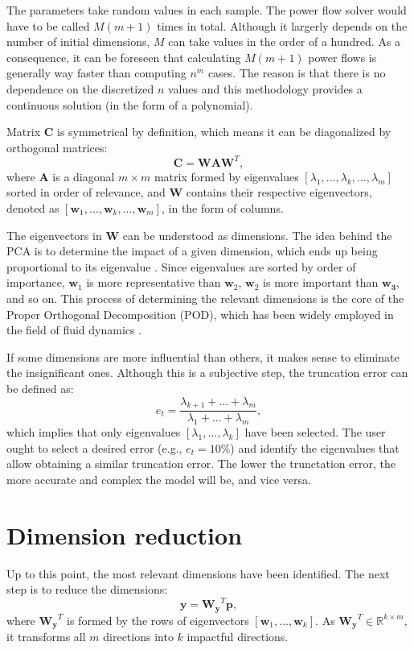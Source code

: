 The parameters take random values in each sample. The power flow solver would have to be called $M(m+1)$ times in total. Although it largerly depends on the number of initial dimensions, $M$ can take values in the order of a hundred. As a consequence, it can be foreseen that calculating $M(m+1)$ power flows is generally way faster than computing $n^m$ cases. The reason is that there is no dependence on the discretized $n$ values and this methodology provides a continuous solution (in the form of a polynomial). 

Matrix $\mathbf{C}$ is symmetrical by definition, which means it can be diagonalized by orthogonal matrices:
\begin{equation}
  \mathbf{C} = \mathbf{W}\mathbf{A}\mathbf{W}^T,
  \label{eq:C2}
\end{equation}
where $\mathbf{A}$ is a diagonal $m\times m$ matrix formed by eigenvalues $[\lambda_1,...,\lambda_k,...,\lambda_m]$ sorted in order of relevance, and $\mathbf{W}$ contains their respective eigenvectors, denoted as $[\mathbf{w}_1, ..., \mathbf{w}_k, ..., \mathbf{w}_m]$, in the form of columns. 

The eigenvectors in $\mathbf{W}$ can be understood as dimensions. The idea behind the PCA is to determine the impact of a given dimension, which ends up being proportional to its eigenvalue \cite{shen2020}. Since eigenvalues are sorted by order of importance, $\mathbf{w}_1$ is more representative than $\mathbf{w}_2$, $\mathbf{w}_2$ is more important than $\mathbf{w_3}$, and so on. This process of determining the relevant dimensions is the core of the Proper Orthogonal Decomposition (POD), which has been widely employed in the field of fluid dynamics \cite{berkooz1993, weiss2019}. 

If some dimensions are more influential than others, it makes sense to eliminate the insignificant ones. Although this is a subjective step, the truncation error can be defined as:
\begin{equation}
  e_t = \frac{\lambda_{k+1} + ... + \lambda_{m}}{\lambda_1 + ... + \lambda_m},
  \label{eq:err1}
\end{equation}
which implies that only eigenvalues $[\lambda_1,..., \lambda_k]$ have been selected. The user ought to select a desired error (e.g., $e_t=10\%$) and identify the eigenvalues that allow obtaining a similar truncation error. The lower the trunctation error, the more accurate and complex the model will be, and vice versa. 

\section{Dimension reduction}
Up to this point, the most relevant dimensions have been identified. The next step is to reduce the dimensions:
\begin{equation}
  \mathbf{y} = \mathbf{W_y}^T \mathbf{p},
  \label{eq:y1}
\end{equation}
where $\mathbf{W_y}^T$ is formed by the rows of eigenvectors $[\mathbf{w}_1, ..., \mathbf{w}_k]$. As $\mathbf{W_y}^T \in \mathbb{R}^{k \times m}$, it transforms all $m$ directions into $k$ impactful directions. 

